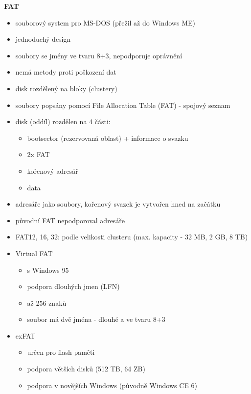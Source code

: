 \documentclass[10pt,a4paper]{article}
\begin{document}
\textbf{FAT}
\begin{itemize}
	\item souborový system pro MS-DOS (přežil až do Windows ME)
	\item jednoduchý design
	\item soubory se jmény ve tvaru 8+3, nepodporuje oprávnění
	\item nemá metody proti poškození dat
	\item disk rozdělený na bloky (clustery)
	\item soubory popsány pomocí File Allocation Table (FAT) - spojový seznam
	\item disk (oddíl) rozdělen na 4 části:
	\begin{itemize}
		\item bootsector (rezervovaná oblast) + informace o svazku
		\item 2x FAT
		\item kořenový adresář
		\item data
	\end{itemize}
	\item adresáře jako soubory, kořenový svazek je vytvořen hned na začátku
	\item původní FAT nepodporoval adresáře
	\item FAT12, 16, 32: podle velikosti clusteru (max. kapacity - 32 MB, 2 GB, 8 TB)
	\item Virtual FAT
	\begin{itemize}
		\item s Windows 95
		\item podpora dlouhých jmen (LFN)
		\item až 256 znaků
		\item soubor má dvě jména - dlouhé a ve tvaru 8+3
	\end{itemize}
	\item exFAT
	\begin{itemize}
		\item určen pro flash paměti
		\item podpora větších disků (512 TB, 64 ZB)
		\item podpora v novějších Windows (původně Windows CE 6)
	\end{itemize}
\end{itemize}
\end{document}
